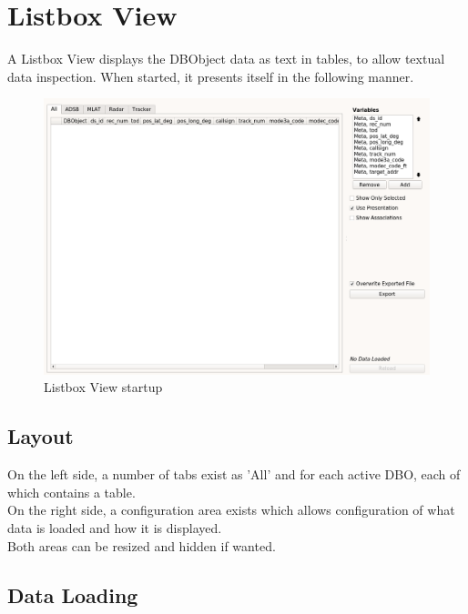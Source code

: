 \chapter{Listbox View}
\label{sec:listbox_view}

A Listbox View displays the DBObject data as text in tables, to allow textual data inspection. When started, it presents itself in the following manner.

\begin{figure}[H]
    \hspace*{-2cm}
    \includegraphics[width=18cm,frame]{../screenshots/listbox_start.png}
  \caption{Listbox View startup}
  \label{fig:listbox_start}
\end{figure}

\section{Layout}


On the left side, a number of tabs exist as 'All' and for each active DBO, each of which contains a table. \\

On the right side, a configuration area exists which allows configuration of what data is loaded and how it is displayed. \\

Both areas can be resized and hidden if wanted.

\section{Data Loading}

